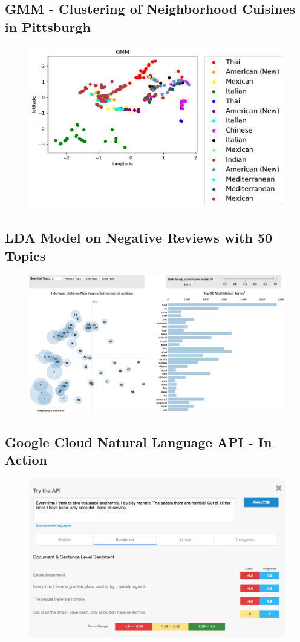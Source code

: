 \documentclass{neu_handout}
\begin{document}
\subsection{GMM - Clustering of Neighborhood Cuisines in Pittsburgh}
\begin{figure}[h]
\centering
{
\includegraphics[width=0.45\linewidth]{gmm_cuisines}
}
\end{figure}


\subsection{LDA Model on Negative Reviews with 50 Topics}
\begin{figure}[h]
\centering
{
\includegraphics[width=0.45\linewidth]{first_image}
}
\end{figure}

\subsection{Google Cloud Natural Language API - In Action}
\begin{figure}[h]
\centering
{
\includegraphics[width=0.45\linewidth]{googleapi}
}
\end{figure}
\end{document}
